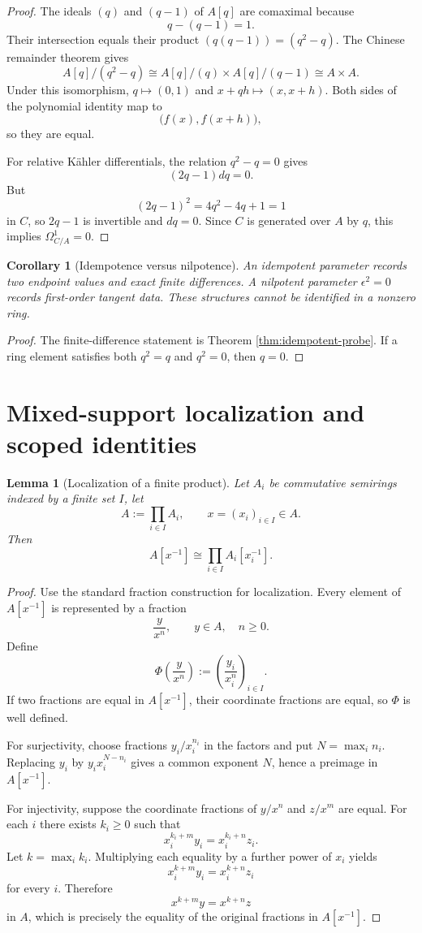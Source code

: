 \documentclass[11pt]{amsart}
\numberwithin{equation}{section}
\newtheorem{corollary}[theorem]{Corollary}
\newtheorem{lemma}[theorem]{Lemma}
\theoremstyle{definition}
\begin{document}
\begin{proof}
The ideals $(q)$ and $(q-1)$ of $A[q]$ are comaximal because
\[
q-(q-1)=1.
\]
Their intersection equals their product $(q(q-1))=(q^2-q)$.  The Chinese remainder theorem gives
\[
A[q]/(q^2-q)
\cong
A[q]/(q)\times A[q]/(q-1)
\cong
A\times A.
\]
Under this isomorphism, $q\mapsto(0,1)$ and $x+qh\mapsto(x,x+h)$.  Both sides of the polynomial identity map to
\[
\bigl(f(x),f(x+h)\bigr),
\]
so they are equal.

For relative K\"ahler differentials, the relation $q^2-q=0$ gives
\[
(2q-1)dq=0.
\]
But
\[
(2q-1)^2=4q^2-4q+1=1
\]
in $C$, so $2q-1$ is invertible and $dq=0$.  Since $C$ is generated over $A$ by $q$, this implies $\Omega^1_{C/A}=0$.
\end{proof}

\begin{corollary}[Idempotence versus nilpotence]
An idempotent parameter records two endpoint values and exact finite differences.  A nilpotent parameter $\epsilon^2=0$ records first-order tangent data.  These structures cannot be identified in a nonzero ring.
\end{corollary}

\begin{proof}
The finite-difference statement is Theorem \ref{thm:idempotent-probe}.  If a ring element satisfies both $q^2=q$ and $q^2=0$, then $q=0$.
\end{proof}

\section{Mixed-support localization and scoped identities}

\begin{lemma}[Localization of a finite product]\label{lem:product-localization}
Let $A_i$ be commutative semirings indexed by a finite set $I$, let
\[
A:=\prod_{i\in I}A_i,
\qquad
x=(x_i)_{i\in I}\in A.
\]
Then
\[
A[x^{-1}]
\cong
\prod_{i\in I}A_i[x_i^{-1}].
\]
\end{lemma}

\begin{proof}
Use the standard fraction construction for localization.  Every element of $A[x^{-1}]$ is represented by a fraction
\[
\frac{y}{x^n},
\qquad y\in A,
\quad n\ge0.
\]
Define
\[
\Phi\left(\frac{y}{x^n}\right)
:=
\left(\frac{y_i}{x_i^n}\right)_{i\in I}.
\]
If two fractions are equal in $A[x^{-1}]$, their coordinate fractions are equal, so $\Phi$ is well defined.

For surjectivity, choose fractions $y_i/x_i^{n_i}$ in the factors and put $N=\max_i n_i$.  Replacing $y_i$ by $y_i x_i^{N-n_i}$ gives a common exponent $N$, hence a preimage in $A[x^{-1}]$.

For injectivity, suppose the coordinate fractions of $y/x^n$ and $z/x^m$ are equal.  For each $i$ there exists $k_i\ge0$ such that
\[
x_i^{k_i+m}y_i=x_i^{k_i+n}z_i.
\]
Let $k=\max_i k_i$.  Multiplying each equality by a further power of $x_i$ yields
\[
x_i^{k+m}y_i=x_i^{k+n}z_i
\]
for every $i$.  Therefore
\[
x^{k+m}y=x^{k+n}z
\]
in $A$, which is precisely the equality of the original fractions in $A[x^{-1}]$.
\end{proof}
\end{document}
